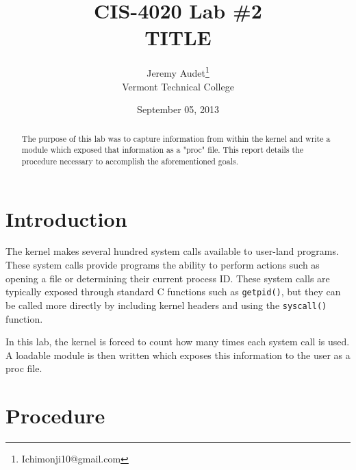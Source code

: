 \documentclass{article}
\newcommand{\code}[1]{\texttt{#1}}
\begin{document}
\title{CIS-4020 Lab \#2\\TITLE}
\author{Jeremy Audet\thanks{Ichimonji10@gmail.com}\\
    Vermont Technical College}
    \date{September 05, 2013}
    \maketitle

\begin{abstract}
    The purpose of this lab was to capture information from within the kernel
    and write a module which exposed that information as a "proc" file. This
    report details the procedure necessary to accomplish the aforementioned
    goals.
\end{abstract}

\section{Introduction}
\label{sec:introduction}

The kernel makes several hundred system calls available to user-land programs.
These system calls provide programs the ability to perform actions such as
opening a file or determining their current process ID. These system calls are
typically exposed through standard C functions such as \code{getpid()}, but they
can be called more directly by including kernel headers and using the
\code{syscall()} function.

In this lab, the kernel is forced to count how many times each system call is
used. A loadable module is then written which exposes this information to the
user as a proc file.

\section{Procedure}
\label{sec:procedure}
\end{document}
